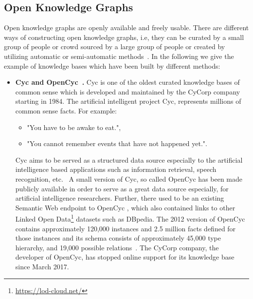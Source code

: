\subsection{Open Knowledge Graphs} 
Open knowledge graphs are openly available and freely usable. There are different ways of constructing open knowledge graphs, i.e, they can be curated by a small group of people or crowd sourced by a large group of people or created by utilizing automatic or semi-automatic methods~\cite{DBLP:journals/semweb/Paulheim17}. In the following we give the example of knowledge bases which have been built by different methods:\\
\begin{itemize}
\item \textbf{Cyc and OpenCyc~\cite{DBLP:journals/cacm/Lenat95}.} Cyc is one of the oldest curated knowledge bases of common sense which is developed and maintained by the CyCorp company starting in 1984. The artificial intelligent project Cyc, represents millions of common sense facts. For example:
\begin{itemize}
\item"You have to be awake to eat.", 
\item"You cannot remember events that have not happened yet.".
\end{itemize}
Cyc aims to be served as a structured data source especially to the artificial intelligence based applications such as information retrieval, speech recognition, etc.~\cite{DBLP:journals/cacm/Lenat95}
A small version of Cyc, so called OpenCyc has been made publicly available in order to serve as a great data source especially, for artificial intelligence researchers. Further, there used to be an existing Semantic Web endpoint to OpenCyc
, which also contained links to other Linked Open Data\footnote{\url{https://lod-cloud.net/}} datasets such as DBpedia. The 2012 version of OpenCyc contains approximately 120,000 instances and 2.5 million facts defined for those instances and its schema consists of approximately 45,000 type hierarchy, and 19,000 possible relations~\cite{DBLP:journals/semweb/Paulheim17}. The CyCorp company, the developer of OpenCyc, has stopped online support for its knowledge base since March 2017.\\


\end{itemize}
